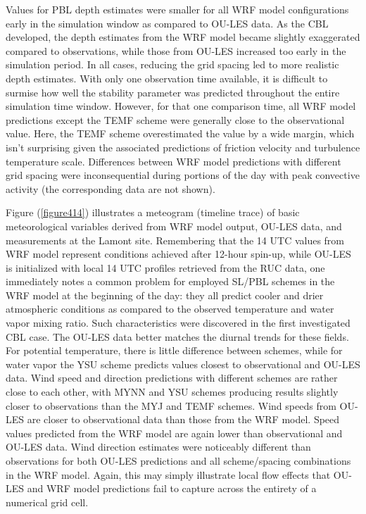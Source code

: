 Values for PBL depth estimates were smaller for all WRF model configurations early in the simulation window as compared to OU-LES data. As the CBL developed, the depth estimates from the WRF model became slightly exaggerated compared to observations, while those from OU-LES increased too early in the simulation period. In all cases, reducing the grid spacing led to more realistic depth estimates. With only one observation time available, it is difficult to surmise how well the stability parameter was predicted throughout the entire simulation time window. However, for that one comparison time, all WRF model predictions except the TEMF scheme were generally close to the observational value. Here, the TEMF scheme overestimated the value by a wide margin, which isn't surprising given the associated predictions of friction velocity and turbulence temperature scale. Differences between WRF model predictions with different grid spacing were inconsequential during portions of the day with peak convective activity (the corresponding data are not shown). 

Figure (\autoref{figure414}) illustrates a meteogram (timeline trace) of basic meteorological variables derived from WRF model output, OU-LES data, and measurements at the Lamont site. Remembering that the 14 UTC values from WRF model represent conditions achieved after 12-hour spin-up, while OU-LES is initialized with local 14 UTC profiles retrieved from the RUC data, one immediately notes a common problem for employed SL\slash PBL schemes in the WRF model at the beginning of the day: they all predict cooler and drier atmospheric conditions as compared to the observed temperature and water vapor mixing ratio. Such characteristics were discovered in the first investigated CBL case. The OU-LES data better matches the diurnal trends for these fields. For potential temperature, there is little difference between schemes, while for water vapor the YSU scheme predicts values closest to observational and OU-LES data. Wind speed and direction predictions with different schemes are rather close to each other, with MYNN and YSU schemes producing results slightly closer to observations than the MYJ and TEMF schemes. Wind speeds from OU-LES are closer to observational data than those from the WRF model. Speed values predicted from the WRF model are again lower than observational and OU-LES data. Wind direction estimates were noticeably different than observations for both OU-LES predictions and all scheme\slash spacing combinations in the WRF model. Again, this may simply illustrate local flow effects that OU-LES and WRF model predictions fail to capture across the entirety of a numerical grid cell.


